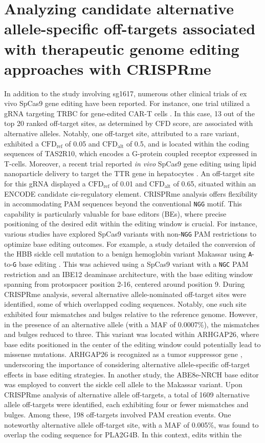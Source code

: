 \documentclass[a4paper, titlepage, openright]{book}
\newcommand{\crisprme}{CRISPRme\xspace}
\begin{document}
\section{Analyzing candidate alternative allele-specific off-targets associated with therapeutic genome editing approaches with \crisprme}
In addition to the study involving sg1617, numerous other clinical trials of ex vivo SpCas9 gene editing have been reported. For instance, one trial utilized a gRNA targeting TRBC for gene-edited CAR-T cells \citep{stadtmauer2020crispr}. In this case, 13 out of the top 20 ranked off-target sites, as determined by CFD score, are associated with alternative alleles. Notably, one off-target site, attributed to a rare variant, exhibited a $\text{CFD}_{\text{ref}}$ of 0.05 and $\text{CFD}_{\text{alt}}$ of 0.5, and is located within the coding sequences of TAS2R10, which encodes a G-protein coupled receptor expressed in T-cells. Moreover, a recent trial reported \emph{in vivo} SpCas9 gene editing using lipid nanoparticle delivery to target the TTR gene in hepatocytes \citep{gillmore2021crispr}. An off-target site for this gRNA displayed a $\text{CFD}_{\text{ref}}$ of 0.01 and $\text{CFD}_{\text{alt}}$ of 0.65, situated within an ENCODE candidate cis-regulatory element. \crisprme analysis offers flexibility in accommodating PAM sequences beyond the conventional \texttt{NGG} motif. This capability is particularly valuable for base editors (BEs), where precise positioning of the desired edit within the editing window is crucial. For instance, various studies have explored SpCas9 variants with non-\texttt{NGG} PAM restrictions to optimize base editing outcomes. For example, a study detailed the conversion of the HBB sickle cell mutation to a benign hemoglobin variant Makassar using \texttt{A}-to-\texttt{G} base editing \citep{chu2021rationally}. This was achieved using a SpCas9 variant with a \texttt{NGC} PAM restriction and an IBE12 deaminase architecture, with the base editing window spanning from protospacer position 2-16, centered around position 9. During \crisprme analysis, several alternative allele-nominated off-target sites were identified, some of which overlapped coding sequences. Notably, one such site exhibited four mismatches and bulges relative to the reference genome. However, in the presence of an alternative allele (with a MAF of 0.0007\%), the mismatches and bulges reduced to three. This variant was located within ARHGAP26, where base edits positioned in the center of the editing window could potentially lead to missense mutations. ARHGAP26 is recognized as a tumor suppressor gene \citep{chen2019smurf1}, underscoring the importance of considering alternative allele-specific off-target effects in base editing strategies. In another study, the ABE8e-NRCH base editor was employed to convert the sickle cell allele to the Makassar variant. Upon \crisprme analysis of alternative allele off-targets, a total of 1609 alternative allele off-targets were identified, each exhibiting four or fewer mismatches and bulges. Among these, 198 off-targets involved PAM creation events. One noteworthy alternative allele off-target site, with a MAF of 0.005\%, was found to overlap the coding sequence for PLA2G4B. In this context, edits within the 
\end{document}
